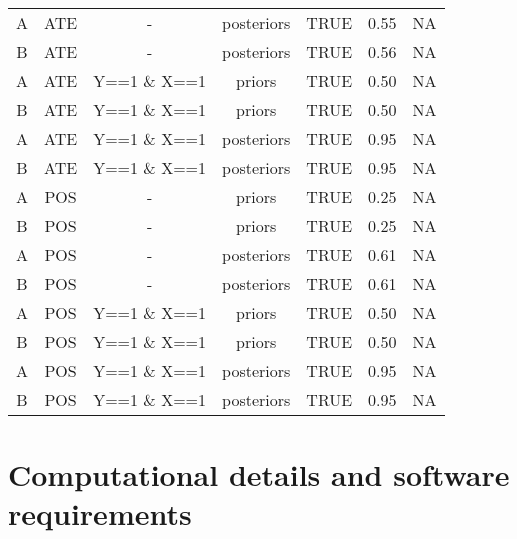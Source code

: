 \documentclass[
  11pt,
  article]{jss}
\begin{document}
\begin{longtable}[t]{ccccccc}
A & ATE & - & posteriors & TRUE & 0.55 & NA\\
B & ATE & - & posteriors & TRUE & 0.56 & NA\\
\addlinespace
A & ATE & Y==1 \& X==1 & priors & TRUE & 0.50 & NA\\
B & ATE & Y==1 \& X==1 & priors & TRUE & 0.50 & NA\\
A & ATE & Y==1 \& X==1 & posteriors & TRUE & 0.95 & NA\\
B & ATE & Y==1 \& X==1 & posteriors & TRUE & 0.95 & NA\\
A & POS & - & priors & TRUE & 0.25 & NA\\
\addlinespace
B & POS & - & priors & TRUE & 0.25 & NA\\
A & POS & - & posteriors & TRUE & 0.61 & NA\\
B & POS & - & posteriors & TRUE & 0.61 & NA\\
A & POS & Y==1 \& X==1 & priors & TRUE & 0.50 & NA\\
B & POS & Y==1 \& X==1 & priors & TRUE & 0.50 & NA\\
\addlinespace
A & POS & Y==1 \& X==1 & posteriors & TRUE & 0.95 & NA\\
B & POS & Y==1 \& X==1 & posteriors & TRUE & 0.95 & NA\\
\bottomrule
\end{longtable}

\FloatBarrier

\newpage{}

\hypertarget{computational-details-and-software-requirements}{%
\section*{Computational details and software
requirements}\label{computational-details-and-software-requirements}}
\end{document}

